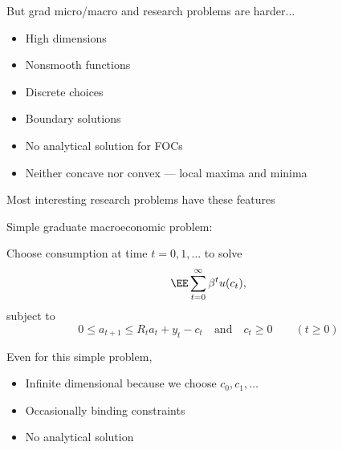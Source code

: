 \begin{frame}
    
    But grad micro/macro and research problems are harder...
    \vspace{1em}

    \begin{itemize}
        \item High dimensions
            \vspace{0.6em}
        \item Nonsmooth functions
            \vspace{0.6em}
        \item Discrete choices
            \vspace{0.6em}
        \item Boundary solutions
            \vspace{0.6em}
        \item No analytical solution for FOCs
            \vspace{0.6em}
        \item Neither concave nor convex --- local maxima and minima
    \end{itemize}

            \vspace{0.6em}
            \vspace{0.6em}
    Most interesting research problems have these features

\end{frame}



\begin{frame}

    \Eg  Simple graduate macroeconomic problem:

            \vspace{0.5em}
    Choose consumption at time $t = 0, 1, \ldots$ to solve
    \begin{equation}
        \label{eq:earnings}
        \EE \sum_{t=0}^{\infty} \beta^t u(c_t),
    \end{equation}
    subject to 
    \begin{equation}
        0 \leq a_{t+1} \leq R_t a_t + y_t - c_t
        \quad \text{and} \quad
        c_t \geq 0
        \qquad (t \geq 0)
    \end{equation}

            \vspace{0.5em}
    Even for this simple problem,
    \begin{itemize}
        \item Infinite dimensional because we choose $c_0, c_1, \ldots$
            \vspace{0.2em}
        \item Occasionally binding constraints
            \vspace{0.2em}
        \item No analytical solution
    \end{itemize}



\end{frame}



